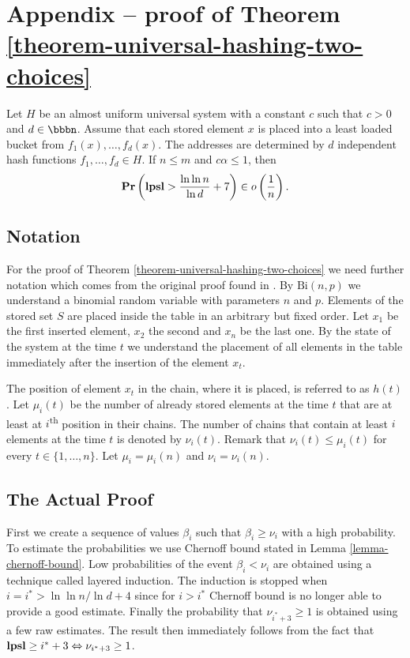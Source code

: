 \section*{Appendix -- proof of Theorem \ref{theorem-universal-hashing-two-choices}}
\setcounter{theorem}{2}

\begin{theorem}
Let $H$ be an almost uniform universal system with a constant $c$ such that $c > 0$ and $d \in \bbbn$. Assume that each stored element $x$ is placed into a least loaded bucket from $f_1(x), \dots, f_d(x)$. The addresses are determined by $d$ independent hash functions $f_1, \dots, f_d \in H$. If $n \leq m$ and $c \alpha \leq 1$, then $$\mathbf{Pr}\left(\mathbf{lpsl} > \frac{\ln \ln n}{\ln d} + 7\right) \in o\left(\frac{1}{n}\right).$$
\end{theorem}

\subsection{Notation}
For the proof of Theorem \ref{theorem-universal-hashing-two-choices} we need further notation which comes from the original proof found in \cite{Mitzenmacher:2005:PCR:1076315}. By $\mathrm{Bi}(n, p)$ we understand a binomial random variable with parameters $n$ and $p$. Elements of the stored set $S$ are placed inside the table in an arbitrary but fixed order. Let $x_1$ be the first inserted element, $x_2$ the second and $x_n$ be the last one. By the state of the system at the time $t$ we understand the placement of all elements in the table immediately after the insertion of the element $x_t$. 

The position of element $x_t$ in the chain, where it is placed, is referred to as $h(t)$. Let $\mu_i(t)$ be the number of already stored elements at the time $t$ that are at least at $i$\textsuperscript{th} position in their chains. The number of chains that contain at least $i$ elements at the time $t$ is denoted by $\nu_i(t)$. Remark that $\nu_i(t) \leq \mu_i(t)$ for every $t \in \{1, \dots, n \}$. Let $\mu_i = \mu_i(n)$ and $\nu_i = \nu_i(n)$.

\subsection{The Actual Proof}
First we create a sequence of values $\beta_i$ such that $\beta_i \geq \nu_i$ with a high probability. To estimate the probabilities we use Chernoff bound stated in Lemma \ref{lemma-chernoff-bound}. Low probabilities of the event $\beta_i < \nu_i$ are obtained using a technique called layered induction. The induction is stopped when $i = i^* > \ln \ln n/\ln d + 4$ since for $i > i^*$ Chernoff bound is no longer able to provide a good estimate. Finally the probability that $\nu_{i^*+3} \geq 1$ is obtained using a few raw estimates. The result then immediately follows from the fact that $\mathbf{lpsl} \geq i^*+3 \Leftrightarrow \nu_{i^* + 3} \geq 1$.

